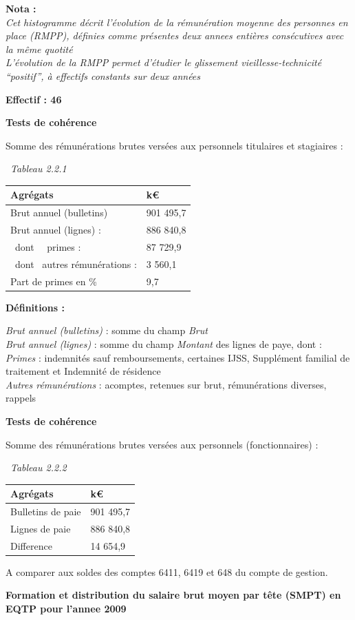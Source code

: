 \textbf{Nota :}\\
\emph{Cet histogramme décrit l'évolution de la rémunération moyenne des
personnes en place (RMPP), définies comme présentes deux annees entières
consécutives avec la même quotité}\\
\emph{L'évolution de la RMPP permet d'étudier le glissement
vieillesse-technicité ``positif'', à effectifs constants sur deux
années}

\textbf{Effectif : 46 }

\textbf{Tests de cohérence}

Somme des rémunérations brutes versées aux personnels titulaires et
stagiaires :

~\emph{Tableau 2.2.1}

\begin{longtable}[]{@{}ll@{}}
\toprule
Agrégats & k€\tabularnewline
\midrule
\endhead
Brut annuel (bulletins) & 901 495,7\tabularnewline
Brut annuel (lignes) : & 886 840,8\tabularnewline
~dont ~~primes : & 87 729,9\tabularnewline
~dont ~autres rémunérations : & 3 560,1\tabularnewline
Part de primes en \% & 9,7\tabularnewline
\bottomrule
\end{longtable}

\textbf{Définitions :}

\emph{Brut annuel (bulletins)} : somme du champ \emph{Brut}\\
\emph{Brut annuel (lignes)} : somme du champ \emph{Montant} des lignes
de paye, dont :\\
\emph{Primes} : indemnités sauf remboursements, certaines IJSS,
Supplément familial de traitement et Indemnité de résidence\\
\emph{Autres rémunérations} : acomptes, retenues sur brut, rémunérations
diverses, rappels

\textbf{Tests de cohérence}

Somme des rémunérations brutes versées aux personnels (fonctionnaires) :

~\emph{Tableau 2.2.2}

\begin{longtable}[]{@{}ll@{}}
\toprule
Agrégats & k€\tabularnewline
\midrule
\endhead
Bulletins de paie & 901 495,7\tabularnewline
Lignes de paie & 886 840,8\tabularnewline
Difference & 14 654,9\tabularnewline
\bottomrule
\end{longtable}

A comparer aux soldes des comptes 6411, 6419 et 648 du compte de
gestion.

\textbf{Formation et distribution du salaire brut moyen par tête (SMPT)
en EQTP pour l'annee 2009 }

